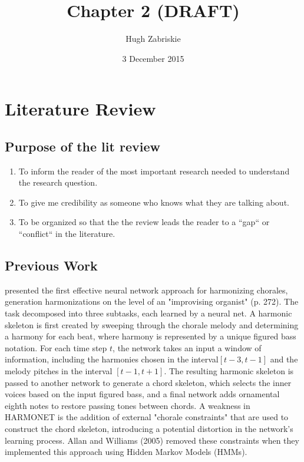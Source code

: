 \documentclass[11pt]{article}
\title{Chapter 2 (DRAFT)}
\author{Hugh Zabriskie}
\date{3 December 2015}
\begin{document}
\maketitle{}

\section{Literature Review}

\subsection{Purpose of the lit review}

\begin{enumerate}
\item To inform the reader of the most important research needed to understand the research question.
\item To give me credibility as someone who knows what they are talking about. 
\item To be organized so that the the review leads the reader to a ``gap`` or ``conflict`` in the literature.
\end{enumerate}

\subsection{Previous Work}

\citet{hild1992harmonet} presented the first effective neural network approach for harmonizing chorales, generation harmonizations on the level of an "improvising organist" (p. 272). The task decomposed into three subtasks, each learned by a neural net. A harmonic skeleton is first created by sweeping through the chorale melody and determining a harmony for each beat, where harmony is represented by a unique figured bass notation. For each time step $t$, the network takes an input a window of information, including the harmonies chosen in the interval$[t-3, t-1]$ and the melody pitches in the interval $[t-1, t+1]$. The resulting harmonic skeleton is passed to another network to generate a chord skeleton, which selects the inner voices based on the input figured bass, and a final network adds ornamental eighth notes to restore passing tones between chords. A weakness in HARMONET is the addition of external "chorale constraints" \citep[p.~271]{hild1992harmonet} that are used to construct the chord skeleton, introducing a potential distortion in the network's learning process. Allan and Williams (2005) removed these constraints when they implemented this approach using Hidden Markov Models (HMMs). \\
\end{document}

